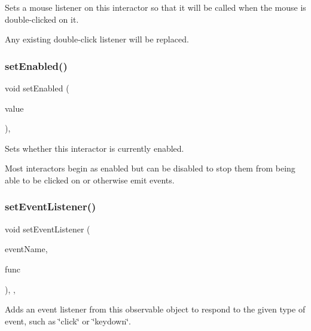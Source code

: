 Sets a mouse listener on this interactor so that it will be called when the mouse is double-\/clicked on it. 

Any existing double-\/click listener will be replaced. \mbox{\label{classGInteractor_ab831367dd84bbd579e02e55bacb21343}} 
\subsubsection{\texorpdfstring{set\+Enabled()}{setEnabled()}}
{\footnotesize\ttfamily void set\+Enabled (\begin{DoxyParamCaption}\item[{bool}]{value }\end{DoxyParamCaption})\hspace{0.3cm}{\ttfamily [virtual]}, {\ttfamily [inherited]}}



Sets whether this interactor is currently enabled. 

Most interactors begin as enabled but can be disabled to stop them from being able to be clicked on or otherwise emit events. \mbox{\label{classGObservable_ad2f6d34961c50f6c1e0659990b79f741}} 
\subsubsection{\texorpdfstring{set\+Event\+Listener()}{setEventListener()}\hspace{0.1cm}{\footnotesize\ttfamily [1/2]}}
{\footnotesize\ttfamily void set\+Event\+Listener (\begin{DoxyParamCaption}\item[{const std\+::string \&}]{event\+Name,  }\item[{G\+Event\+Listener}]{func }\end{DoxyParamCaption})\hspace{0.3cm}{\ttfamily [protected]}, {\ttfamily [virtual]}, {\ttfamily [inherited]}}



Adds an event listener from this observable object to respond to the given type of event, such as \char`\"{}click\char`\"{} or \char`\"{}keydown\char`\"{}. 

